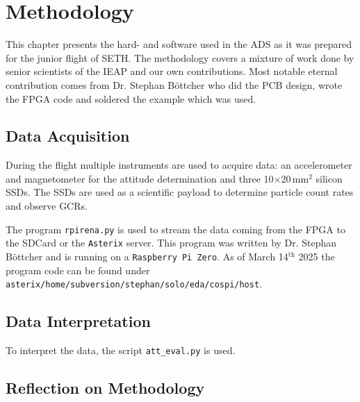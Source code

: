 \chapter{Methodology \label{ch:methodology}}
This chapter presents the hard- and software used in the \ac{ADS} as it was prepared for the junior flight of \ac{SETH}. The methodology covers a mixture of work done by senior scientists of the \ac{IEAP} and our own contributions. Most notable eternal contribution comes from Dr. Stephan Böttcher who did the \ac{PCB} design, wrote the \ac{FPGA} code and soldered the example which was used. 

\section{Data Acquisition \label{sec:data_acquisition}}
During the flight multiple instruments are used to acquire data: an accelerometer and magnetometer for the attitude determination and three 10$\times$20\,mm$^2$ silicon \acfp{SSD}. The \acp{SSD} are used as a scientific payload to determine particle count rates and observe \acp{GCR}.

The program \verb|rpirena.py| is used to stream the data coming from the \ac{FPGA} to the SD\:Card or the \verb|Asterix| server. This program was written by Dr. Stephan Böttcher and is running on a \verb|Raspberry Pi Zero|. As of March 14$^\mathrm{th}$ 2025 the program code can be found under \verb|asterix/home/subversion/stephan/solo/eda/cospi/host|. 

\section{Data Interpretation \label{sec:data_interpretation}}
To interpret the data, the script \verb|att_eval.py| is used.

\section{Reflection on Methodology \label{sec:reflection_methodology}}